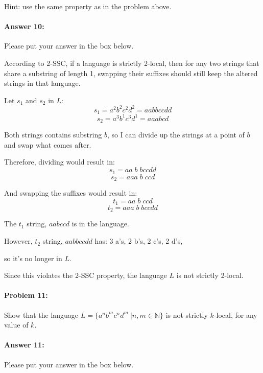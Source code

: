 \documentclass[10pt]{article}
\newenvironment{AnswerBox}{\begin{mdframed}[style=simple]}{\end{mdframed}}
\begin{document}
 Hint: use the same property as in the problem above.

\paragraph{Answer 10:} Please put your answer in the box below.


\begin{AnswerBox}%

    According to 2-SSC, if a language is strictly 2-local, then for any two strings that share a substring of length 1, swapping their suffixes should still keep the altered strings in that language.
    
    Let $s_1$ and $s_2$ in $L$:
    \[ s_1 = a^2 b^2 c^2 d^2 = aabbccdd \]
    \[ s_2 = a^3 b^1 c^3 d^1 = aaabcd \]
    
    Both strings contains substring \(b\), so I can divide up the strings at a point of \(b\) and swap what comes after.
    
    Therefore, dividing would result in:
    \[ s_1 = aa \; b \; bccdd \]
    \[ s_2 = aaa \; b \; ccd \]
    
    And swapping the suffixes would result in:
    \[ t_1 = aa\;b\;ccd \]
    \[ t_2 = aaa\;b\;bccdd \]
    
    The $t_1$ string, $aabccd$ is in the language.
    
    However, $t_2$ string, $aabbccdd$ has: 3 a's, 2 b's, 2 c's, 2 d's,
    
    so it's no longer in $L$.
    
    Since this violates the 2-SSC property, the language \(L\) is not strictly 2-local.
    
\end{AnswerBox}%


\hrulefill %

\paragraph{Problem 11:}

Show that the language $L= \{a^n b^m c^n d^m\ | n, m \in \mathbb{N} \}$ is not
strictly $k$-local, for any value of $k$.

\paragraph{Answer 11:} Please put your answer in the box below.
\end{document}
